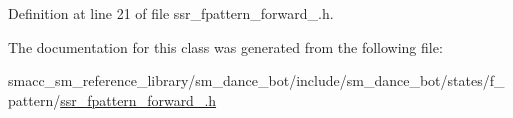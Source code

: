 Definition at line 21 of file ssr\+\_\+fpattern\+\_\+forward\+\_.\+h.




The documentation for this class was generated from the following file\+:\begin{DoxyCompactItemize}
\item 
smacc\+\_\+sm\+\_\+reference\+\_\+library/sm\+\_\+dance\+\_\+bot/include/sm\+\_\+dance\+\_\+bot/states/f\+\_\+pattern/\hyperlink{ssr__fpattern__forward__1_8h}{ssr\+\_\+fpattern\+\_\+forward\+\_.\+h}\end{DoxyCompactItemize}
